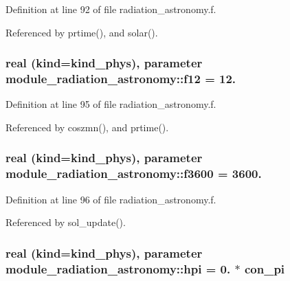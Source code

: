 Definition at line 92 of file radiation\+\_\+astronomy.\+f.



Referenced by prtime(), and solar().

\subsubsection[{\texorpdfstring{f12}{f12}}]{\setlength{\rightskip}{0pt plus 5cm}real (kind=kind\+\_\+phys), parameter module\+\_\+radiation\+\_\+astronomy\+::f12 = 12.\hspace{0.3cm}{\ttfamily [private]}}\hypertarget{namespacemodule__radiation__astronomy_ad59856e8f877eb05a6b22610f14a391d}{}\label{namespacemodule__radiation__astronomy_ad59856e8f877eb05a6b22610f14a391d}


Definition at line 95 of file radiation\+\_\+astronomy.\+f.



Referenced by coszmn(), and prtime().

\subsubsection[{\texorpdfstring{f3600}{f3600}}]{\setlength{\rightskip}{0pt plus 5cm}real (kind=kind\+\_\+phys), parameter module\+\_\+radiation\+\_\+astronomy\+::f3600 = 3600.\hspace{0.3cm}{\ttfamily [private]}}\hypertarget{namespacemodule__radiation__astronomy_a37b491dde50d06e339effb4a31d9f245}{}\label{namespacemodule__radiation__astronomy_a37b491dde50d06e339effb4a31d9f245}


Definition at line 96 of file radiation\+\_\+astronomy.\+f.



Referenced by sol\+\_\+update().

\subsubsection[{\texorpdfstring{hpi}{hpi}}]{\setlength{\rightskip}{0pt plus 5cm}real (kind=kind\+\_\+phys), parameter module\+\_\+radiation\+\_\+astronomy\+::hpi = 0. $\ast$ con\+\_\+pi\hspace{0.3cm}{\ttfamily [private]}}\hypertarget{namespacemodule__radiation__astronomy_a7369d8561566f5e7e51ccc40e09f2520}{}\label{namespacemodule__radiation__astronomy_a7369d8561566f5e7e51ccc40e09f2520}


